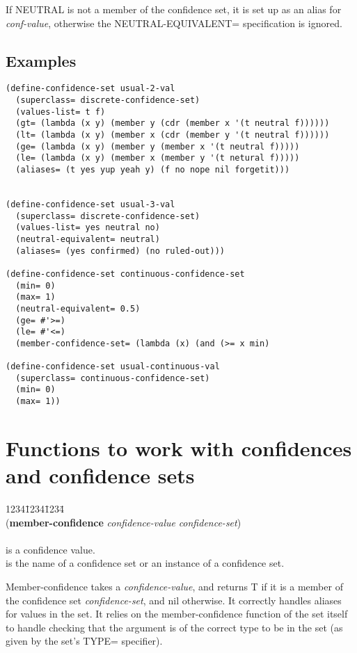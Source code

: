 If NEUTRAL is not a member of the confidence set, it is set up as an
alias for {\it conf-value}, otherwise the NEUTRAL-EQUIVALENT=
specification is ignored.



\subsection{Examples}

\begin{verbatim}
(define-confidence-set usual-2-val
  (superclass= discrete-confidence-set)
  (values-list= t f)
  (gt= (lambda (x y) (member y (cdr (member x '(t neutral f))))))
  (lt= (lambda (x y) (member x (cdr (member y '(t neutral f))))))
  (ge= (lambda (x y) (member y (member x '(t neutral f)))))
  (le= (lambda (x y) (member x (member y '(t netural f)))))
  (aliases= (t yes yup yeah y) (f no nope nil forgetit)))


(define-confidence-set usual-3-val 
  (superclass= discrete-confidence-set)
  (values-list= yes neutral no)
  (neutral-equivalent= neutral)
  (aliases= (yes confirmed) (no ruled-out)))

(define-confidence-set continuous-confidence-set
  (min= 0)
  (max= 1)
  (neutral-equivalent= 0.5)
  (ge= #'>=)
  (le= #'<=)
  (member-confidence-set= (lambda (x) (and (>= x min)

(define-confidence-set usual-continuous-val
  (superclass= continuous-confidence-set)
  (min= 0)
  (max= 1))
\end{verbatim}

\section{Functions to work with confidences and confidence sets}

\begin{tabbing}
1234\=1234\=1234\= \kill
\\
({\bf member-confidence} {\it confidence-value\/} {\it confidence-set}) \\
\\
\> is a confidence value. \\
\> is the name of a confidence set or an
instance of a confidence set.\\ 
\end{tabbing}
Member-confidence takes a {\it confidence-value\/}, and returns T if
it is a member of the confidence set {\it confidence-set\/}, and nil
otherwise. It correctly handles aliases for values in the set. It
relies on the member-confidence function of the set itself to handle
checking that the argument is of the correct type to be in the set (as
given by the set's TYPE= specifier).

